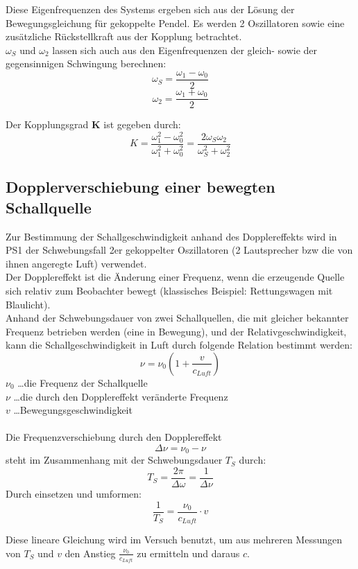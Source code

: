 \documentclass[12pt,a4paper]{article}
\begin{document}
\begin{multicols}{2}
\noindent Diese Eigenfrequenzen des Systems ergeben sich aus der Lösung der Bewegungsgleichung für gekoppelte Pendel. Es werden 2 Oszillatoren sowie eine zusätzliche Rückstellkraft aus der Kopplung betrachtet.\\
$\omega_S$ und $\omega_2$ lassen sich auch aus den Eigenfrequenzen der gleich- sowie der gegensinnigen Schwingung berechnen:
$$\omega_S = \frac{\omega_1 - \omega_0}{2}$$
$$\omega_2 = \frac{\omega_1 +\omega_0}{2}$$

\noindent Der Kopplungsgrad \textbf{K} ist gegeben durch:
$$K = \frac{\omega_1^2 - \omega_0^2}{\omega_1^2 + \omega_0^2} =  \frac{2\omega_S \omega_2}{\omega_S^2 + \omega_2^2} $$


\subsection{Dopplerverschiebung einer bewegten Schallquelle}
Zur Bestimmung der Schallgeschwindigkeit anhand des Dopplereffekts wird in PS1 der Schwebungsfall 2er gekoppelter Oszillatoren (2 Lautsprecher bzw die von ihnen angeregte Luft) verwendet.\\
Der Dopplereffekt ist die Änderung einer Frequenz, wenn die erzeugende Quelle sich relativ zum Beobachter bewegt (klassisches Beispiel: Rettungswagen mit Blaulicht).\\
Anhand der Schwebungsdauer von zwei Schallquellen, die mit gleicher bekannter Frequenz betrieben werden (eine in Bewegung), und der Relativgeschwindigkeit, kann die Schallgeschwindigkeit in Luft durch folgende Relation bestimmt werden:
$$\nu = \nu_0(1 + \frac{v}{c_{Luft}})$$
$\nu_0$ \ldots die Frequenz der Schallquelle\\ 
$\nu$ \ldots die durch den Dopplereffekt veränderte Frequenz\\
$v$ \ldots Bewegungsgeschwindigkeit\\
\\
Die Frequenzverschiebung durch den Dopplereffekt
$$\Delta \nu = \nu_0 - \nu$$
steht im Zusammenhang mit der Schwebungsdauer $T_S$ durch:
$$T_S = \frac{2 \pi}{\Delta \omega}= \frac{1}{\Delta \nu}$$
Durch einsetzen und umformen:
$$\frac{1}{T_S} = \frac{\nu_0}{c_{Luft}}\cdot v$$

Diese lineare Gleichung wird im Versuch benutzt, um aus mehreren Messungen von $T_S$ und $v$ den Anstieg $\frac{\nu_0}{c_{Luft}}$ zu ermitteln und daraus $c$.



\end{multicols}
\end{document}
